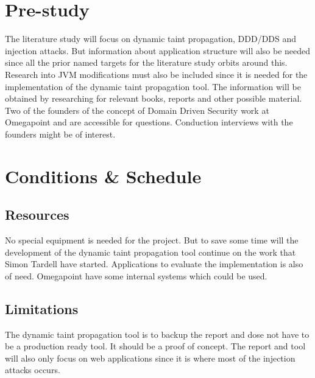 \documentclass{../kththesis}
\begin{document}
\chapter{Pre-study}
The literature study will focus on dynamic taint propagation, DDD/DDS and injection attacks. But information about application structure will also be needed since all the prior named targets for the literature study orbits around this. Research into JVM modifications must also be included since it is needed for the implementation of the dynamic taint propagation tool. The information will be obtained by researching for relevant books, reports and other possible material. Two of the founders of the concept of Domain Driven Security work at Omegapoint and are accessible for questions. Conduction interviews with the founders might be of interest.



\chapter{Conditions \& Schedule}
\section{Resources}
No special equipment is needed for the project. But to save some time will the development of the dynamic taint propagation tool continue on the work that Simon Tardell have started. Applications to evaluate the implementation is also of need. Omegapoint have some internal systems which could be used.


\section{Limitations}
The dynamic taint propagation tool is to backup the report and dose not have to be a production ready tool. It should be a proof of concept. The report and tool will also only focus on web applications since it is where most of the injection attacks occurs. 
\end{document}
